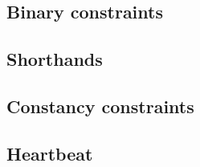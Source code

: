 \subsection{Binary constraints}    \label{mxp: constraints: binary}         
\subsection{Shorthands}            \label{mxp: constraints: shorthands}     
\subsection{Constancy constraints} \label{mxp: constraints: constancies}    
\subsection{Heartbeat}             \label{mxp: constraints: heartbeat}      
